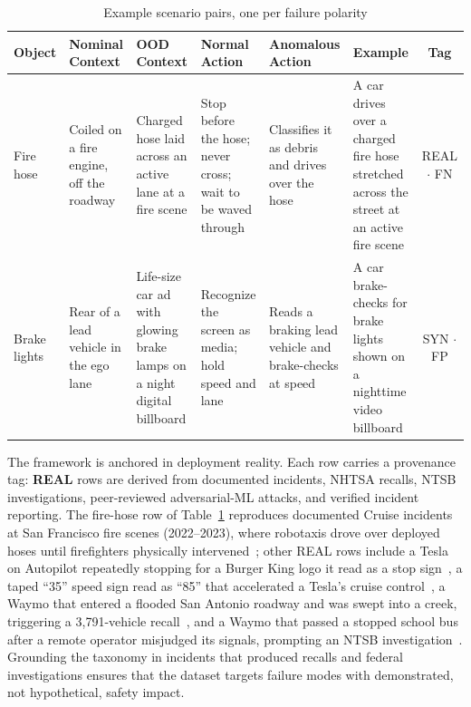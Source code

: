 \documentclass[conference]{IEEEtran}
\begin{document}
\begin{table}[htbp]
\caption{Example scenario pairs, one per failure polarity}
\begin{center}
\small
\begin{tabular}{|p{1.4cm}|p{2.4cm}|p{2.7cm}|p{2.6cm}|p{2.5cm}|p{3.2cm}|c|}
\hline
\textbf{Object} & \textbf{Nominal Context} & \textbf{OOD Context} & \textbf{Normal Action} & \textbf{Anomalous Action} & \textbf{Example} & \textbf{Tag} \\
\hline
Fire hose & Coiled on a fire engine, off the roadway & Charged hose laid across an active lane at a fire scene & Stop before the hose; never cross; wait to be waved through & Classifies it as debris and drives over the hose & A car drives over a charged fire hose stretched across the street at an active fire scene & REAL $\cdot$ FN \\
\hline
Brake lights & Rear of a lead vehicle in the ego lane & Life-size car ad with glowing brake lamps on a night digital billboard & Recognize the screen as media; hold speed and lane & Reads a braking lead vehicle and brake-checks at speed & A car brake-checks for brake lights shown on a nighttime video billboard & SYN $\cdot$ FP \\
\hline
\end{tabular}
\label{tab:examples}
\end{center}
\end{table}

The framework is anchored in deployment reality. Each row carries a provenance tag: \textbf{REAL} rows are derived from documented incidents, NHTSA recalls, NTSB investigations, peer-reviewed adversarial-ML attacks, and verified incident reporting. The fire-hose row of Table~\ref{tab:examples} reproduces documented Cruise incidents at San Francisco fire scenes (2022--2023), where robotaxis drove over deployed hoses until firefighters physically intervened~\cite{b24}; other REAL rows include a Tesla on Autopilot repeatedly stopping for a Burger King logo it read as a stop sign~\cite{b25}, a taped ``35'' speed sign read as ``85'' that accelerated a Tesla's cruise control~\cite{b26}, a Waymo that entered a flooded San Antonio roadway and was swept into a creek, triggering a 3{,}791-vehicle recall~\cite{b27}, and a Waymo that passed a stopped school bus after a remote operator misjudged its signals, prompting an NTSB investigation~\cite{b28}. Grounding the taxonomy in incidents that produced recalls and federal investigations ensures that the dataset targets failure modes with demonstrated, not hypothetical, safety impact.
\end{document}
